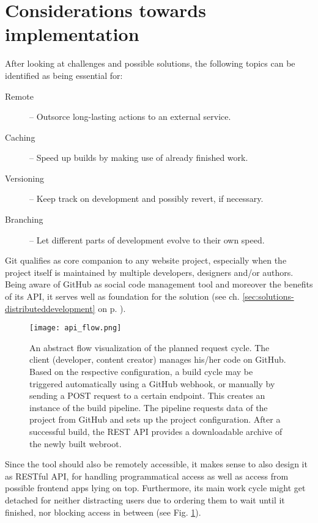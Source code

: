 \section{Considerations towards implementation}
\label{sec:primarythoughts}

After looking at challenges and possible solutions, the following topics can be identified as being essential for:

\begin{description}
  \item[Remote] -- Outsorce long-lasting actions to an external service.
  \item[Caching] -- Speed up builds by making use of already finished work.
  \item[Versioning] -- Keep track on development and possibly revert, if necessary.
  \item[Branching] -- Let different parts of development evolve to their own speed.
\end{description}

Git qualifies as core companion to any website project, especially when the project itself is maintained by multiple developers, designers and/or authors. Being aware of GitHub as social code management tool and moreover the benefits of its API, it serves well as foundation for the solution (see ch. \ref{sec:solutions-distributeddevelopment} on p. \pageref{sec:solutions-distributeddevelopment}).

\begin{figure} %
    \centering
    \texttt{[image: api\_flow.png]}
    \caption{An abstract flow visualization of the planned request cycle. The client (developer, content creator) manages his/her code on GitHub. Based on the respective configuration, a build cycle may be triggered automatically using a GitHub webhook, or manually by sending a POST request to a certain endpoint. This creates an instance of the build pipeline. The pipeline requests data of the project from GitHub and sets up the project configuration. After a successful build, the REST API provides a downloadable archive of the newly built webroot.}
    \label{fig:api-flow}
\end{figure}
%

Since the tool should also be remotely accessible, it makes sense to also design it as RESTful API, for handling programmatical access as well as access from possible frontend apps lying on top. Furthermore, its main work cycle might get detached for neither distracting users due to ordering them to wait until it finished, nor blocking access in between (see Fig. \ref{fig:api-flow}).

